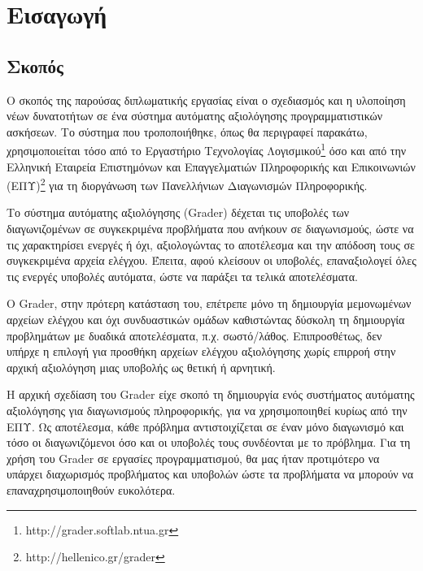 \documentclass[diploma]{softlab-thesis}
\begin{document}

\mainmatter

\chapter{Εισαγωγή}

\section{Σκοπός}

Ο σκοπός της παρούσας διπλωματικής εργασίας είναι ο σχεδιασμός και η υλοποίηση
νέων δυνατοτήτων σε ένα σύστημα αυτόματης αξιολόγησης προγραμματιστικών
ασκήσεων. Το σύστημα που τροποποιήθηκε, όπως θα περιγραφεί παρακάτω,
χρησιμοποιείται τόσο από το Εργαστήριο Τεχνολογίας
Λογισμικού\footnote{http://grader.softlab.ntua.gr} όσο και από την Ελληνική
Εταιρεία Επιστημόνων και Επαγγελματιών Πληροφορικής και Επικοινωνιών
(ΕΠΥ)\footnote{http://hellenico.gr/grader} για τη διοργάνωση των Πανελλήνιων
Διαγωνισμών Πληροφορικής.

\bigskip

Το σύστημα αυτόματης αξιολόγησης (Grader) δέχεται τις υποβολές των
διαγωνιζομένων σε συγκεκριμένα προβλήματα που ανήκουν σε διαγωνισμούς,
ώστε να τις χαρακτηρίσει ενεργές ή όχι, αξιολογώντας
το αποτέλεσμα και την απόδοση τους σε συγκεκριμένα αρχεία ελέγχου.
Έπειτα, αφού κλείσουν οι υποβολές, επαναξιολογεί όλες τις ενεργές
υποβολές αυτόματα, ώστε να παράξει τα τελικά αποτελέσματα.

\bigskip

Ο Grader, στην πρότερη κατάσταση του, επέτρεπε μόνο τη δημιουργία
μεμονωμένων αρχείων ελέγχου και όχι συνδυαστικών ομάδων καθιστώντας
δύσκολη τη δημιουργία προβλημάτων με δυαδικά αποτελέσματα, π.χ. σωστό/λάθος.
Επιπροσθέτως, δεν υπήρχε η επιλογή για προσθήκη αρχείων ελέγχου αξιολόγησης
χωρίς επιρροή στην αρχική αξιολόγηση μιας υποβολής ως θετική ή αρνητική.

\bigskip

Η αρχική σχεδίαση του Grader είχε σκοπό τη δημιουργία ενός συστήματος αυτόματης
αξιολόγησης για διαγωνισμούς πληροφορικής, για να χρησιμοποιηθεί κυρίως από την
ΕΠΥ. Ως αποτέλεσμα, κάθε πρόβλημα αντιστοιχίζεται σε έναν μόνο διαγωνισμό και τόσο
οι διαγωνιζόμενοι όσο και οι υποβολές τους συνδέονται με το πρόβλημα. Για τη χρήση
του Grader σε εργασίες προγραμματισμού, θα μας ήταν προτιμότερο να υπάρχει
διαχωρισμός προβλήματος και υποβολών ώστε τα προβλήματα να μπορούν να
επαναχρησιμοποιηθούν ευκολότερα.
\end{document}
